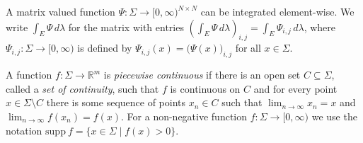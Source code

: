 \documentclass[a4paper,UKenglish,cleveref, autoref,mathscr]{lipics-v2019}
\newcommand{\RR}{\mathbb{R}}
\newcommand{\1}{\mathbbm{1}}
\newcommand{\supp}{\mathrm{supp}}
\begin{document}
A matrix valued function $\Psi : \Sigma \rightarrow [0,\infty)^{N \times N}$ can be integrated element-wise.
We write $\int_E \Psi\,d\lambda$ for the matrix with entries $\left( \int_E \Psi\, d\lambda \right)_{i,j} = \int_E \Psi_{i,j}\, d\lambda$, where $\Psi_{i,j} : \Sigma \rightarrow [0,\infty)$ is defined by $\Psi_{i,j}(x) = \big( \Psi(x) \big)_{i,j}$ for all $x \in \Sigma$.


A function $f : \Sigma \rightarrow \RR^m$ is \emph{piecewise continuous} if there is an open set $C \subseteq \Sigma$, called a \emph{set of continuity}, such that $f$ is continuous on $C$ and for every point $x \in  \Sigma \setminus C$ there is some sequence of points $x_n \in C$ such that $\lim_{n \rightarrow \infty} x_n = x$ and $\lim_{n \rightarrow \infty} f(x_n) = f(x)$. For a non-negative function $f : \Sigma \rightarrow [0,\infty)$ we use the notation ${\supp~f = \{x \in \Sigma \mid f(x) > 0\}}$.
\end{document}
